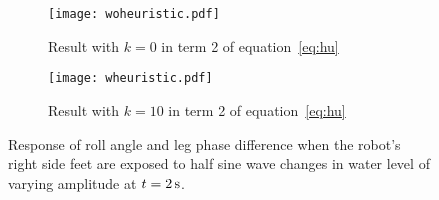 \vspace{-0.25in}
\begin{figure}[tb]
\centering
\begin{subfigure}[t]{\textwidth}
    \centering
    \texttt{[image: woheuristic.pdf]}
    \caption{Result with $k=0$ in term 2 of equation~\ref{eq:hu}} 
    \label{fig:woheu}
    \vspace{0.15 in}
\end{subfigure}
\begin{subfigure}[t]{\textwidth}
    \centering
    \texttt{[image: wheuristic.pdf]}
    \caption{Result with $k=10$ in term 2 of equation~\ref{eq:hu}} 
    \label{fig:wheu}
\end{subfigure}
\caption{Response of roll angle and leg phase difference when the robot's right side feet are exposed to half sine wave changes in water level of varying amplitude at $t=\unit[2]{s}$.} 
\label{fig:results}
\end{figure}
